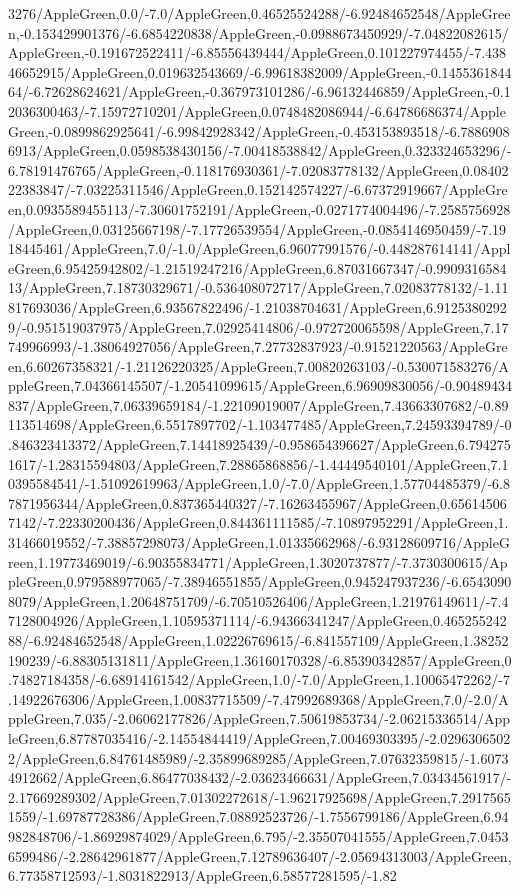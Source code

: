 {\begin{tikzternal}
3276/AppleGreen,0.0/-7.0/AppleGreen,0.46525524288/-6.92484652548/AppleGreen,-0.153429901376/-6.6854220838/AppleGreen,-0.0988673450929/-7.04822082615/AppleGreen,-0.191672522411/-6.85556439444/AppleGreen,0.101227974455/-7.43846652915/AppleGreen,0.019632543669/-6.99618382009/AppleGreen,-0.145536184464/-6.72628624621/AppleGreen,-0.367973101286/-6.96132446859/AppleGreen,-0.12036300463/-7.15972710201/AppleGreen,0.0748482086944/-6.64786686374/AppleGreen,-0.0899862925641/-6.99842928342/AppleGreen,-0.453153893518/-6.78869086913/AppleGreen,0.0598538430156/-7.00418538842/AppleGreen,0.323324653296/-6.78191476765/AppleGreen,-0.118176930361/-7.02083778132/AppleGreen,0.0840222383847/-7.03225311546/AppleGreen,0.152142574227/-6.67372919667/AppleGreen,0.0935589455113/-7.30601752191/AppleGreen,-0.0271774004496/-7.2585756928/AppleGreen,0.03125667198/-7.17726539554/AppleGreen,-0.0854146950459/-7.1918445461/AppleGreen,7.0/-1.0/AppleGreen,6.96077991576/-0.448287614141/AppleGreen,6.95425942802/-1.21519247216/AppleGreen,6.87031667347/-0.990931658413/AppleGreen,7.18730329671/-0.536408072717/AppleGreen,7.02083778132/-1.11817693036/AppleGreen,6.93567822496/-1.21038704631/AppleGreen,6.91253802929/-0.951519037975/AppleGreen,7.02925414806/-0.972720065598/AppleGreen,7.17749966993/-1.38064927056/AppleGreen,7.27732837923/-0.91521220563/AppleGreen,6.60267358321/-1.21126220325/AppleGreen,7.00820263103/-0.530071583276/AppleGreen,7.04366145507/-1.20541099615/AppleGreen,6.96909830056/-0.90489434837/AppleGreen,7.06339659184/-1.22109019007/AppleGreen,7.43663307682/-0.89113514698/AppleGreen,6.5517897702/-1.103477485/AppleGreen,7.24593394789/-0.846323413372/AppleGreen,7.14418925439/-0.958654396627/AppleGreen,6.7942751617/-1.28315594803/AppleGreen,7.28865868856/-1.44449540101/AppleGreen,7.10395584541/-1.51092619963/AppleGreen,1.0/-7.0/AppleGreen,1.57704485379/-6.87871956344/AppleGreen,0.837365440327/-7.16263455967/AppleGreen,0.656145067142/-7.22330200436/AppleGreen,0.844361111585/-7.10897952291/AppleGreen,1.31466019552/-7.38857298073/AppleGreen,1.01335662968/-6.93128609716/AppleGreen,1.19773469019/-6.90355834771/AppleGreen,1.3020737877/-7.3730300615/AppleGreen,0.979588977065/-7.38946551855/AppleGreen,0.945247937236/-6.65430908079/AppleGreen,1.20648751709/-6.70510526406/AppleGreen,1.21976149611/-7.47128004926/AppleGreen,1.10595371114/-6.94366341247/AppleGreen,0.46525524288/-6.92484652548/AppleGreen,1.02226769615/-6.841557109/AppleGreen,1.38252190239/-6.88305131811/AppleGreen,1.36160170328/-6.85390342857/AppleGreen,0.74827184358/-6.68914161542/AppleGreen,1.0/-7.0/AppleGreen,1.10065472262/-7.14922676306/AppleGreen,1.00837715509/-7.47992689368/AppleGreen,7.0/-2.0/AppleGreen,7.035/-2.06062177826/AppleGreen,7.50619853734/-2.06215336514/AppleGreen,6.87787035416/-2.14554844419/AppleGreen,7.00469303395/-2.02963065022/AppleGreen,6.84761485989/-2.35899689285/AppleGreen,7.07632359815/-1.60734912662/AppleGreen,6.86477038432/-2.03623466631/AppleGreen,7.03434561917/-2.17669289302/AppleGreen,7.01302272618/-1.96217925698/AppleGreen,7.29175651559/-1.69787728386/AppleGreen,7.08892523726/-1.7556799186/AppleGreen,6.94982848706/-1.86929874029/AppleGreen,6.795/-2.35507041555/AppleGreen,7.04536599486/-2.28642961877/AppleGreen,7.12789636407/-2.05694313003/AppleGreen,6.77358712593/-1.8031822913/AppleGreen,6.58577281595/-1.82
\end{tikzternal}}
